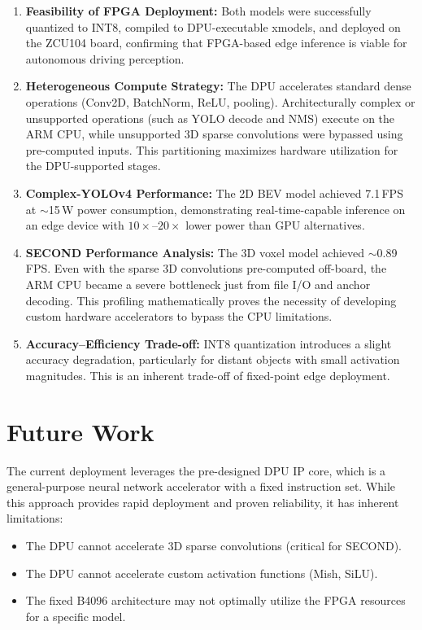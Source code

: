 \documentclass[12pt, a4paper]{report}
\begin{document}
\begin{enumerate}
    \item \textbf{Feasibility of FPGA Deployment:} Both models were successfully quantized to INT8, compiled to DPU-executable xmodels, and deployed on the ZCU104 board, confirming that FPGA-based edge inference is viable for autonomous driving perception.

    \item \textbf{Heterogeneous Compute Strategy:} The DPU accelerates standard dense operations (Conv2D, BatchNorm, ReLU, pooling). Architecturally complex or unsupported operations (such as YOLO decode and NMS) execute on the ARM CPU, while unsupported 3D sparse convolutions were bypassed using pre-computed inputs. This partitioning maximizes hardware utilization for the DPU-supported stages.
    
    \item \textbf{Complex-YOLOv4 Performance:} The 2D BEV model achieved 7.1\,FPS at $\sim$15\,W power consumption, demonstrating real-time-capable inference on an edge device with $10\times$--$20\times$ lower power than GPU alternatives.

    \item \textbf{SECOND Performance Analysis:} The 3D voxel model achieved $\sim$0.89\,FPS. Even with the sparse 3D convolutions pre-computed off-board, the ARM CPU became a severe bottleneck just from file I/O and anchor decoding. This profiling mathematically proves the necessity of developing custom hardware accelerators to bypass the CPU limitations.

    \item \textbf{Accuracy--Efficiency Trade-off:} INT8 quantization introduces a slight accuracy degradation, particularly for distant objects with small activation magnitudes. This is an inherent trade-off of fixed-point edge deployment.
\end{enumerate}

\section{Future Work}

The current deployment leverages the pre-designed DPU IP core, which is a general-purpose neural network accelerator with a fixed instruction set. While this approach provides rapid deployment and proven reliability, it has inherent limitations:

\begin{itemize}[nosep]
    \item The DPU cannot accelerate 3D sparse convolutions (critical for SECOND).
    \item The DPU cannot accelerate custom activation functions (Mish, SiLU).
    \item The fixed B4096 architecture may not optimally utilize the FPGA resources for a specific model.
\end{itemize}
\end{document}
